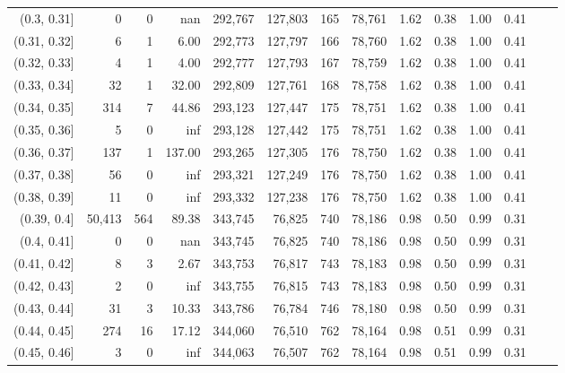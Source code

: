 \begin{tabular}{rrrrrrrrrrrrrr}
(0.3, 0.31]    &       0 &       0 &       nan &  292,767 &  127,803 &     165 &  78,761 &  1.62 &  0.38 &  1.00 &      0.41 \\
(0.31, 0.32]   &       6 &       1 &      6.00 &  292,773 &  127,797 &     166 &  78,760 &  1.62 &  0.38 &  1.00 &      0.41 \\
(0.32, 0.33]   &       4 &       1 &      4.00 &  292,777 &  127,793 &     167 &  78,759 &  1.62 &  0.38 &  1.00 &      0.41 \\
(0.33, 0.34]   &      32 &       1 &     32.00 &  292,809 &  127,761 &     168 &  78,758 &  1.62 &  0.38 &  1.00 &      0.41 \\
(0.34, 0.35]   &     314 &       7 &     44.86 &  293,123 &  127,447 &     175 &  78,751 &  1.62 &  0.38 &  1.00 &      0.41 \\
(0.35, 0.36]   &       5 &       0 &       inf &  293,128 &  127,442 &     175 &  78,751 &  1.62 &  0.38 &  1.00 &      0.41 \\
(0.36, 0.37]   &     137 &       1 &    137.00 &  293,265 &  127,305 &     176 &  78,750 &  1.62 &  0.38 &  1.00 &      0.41 \\
(0.37, 0.38]   &      56 &       0 &       inf &  293,321 &  127,249 &     176 &  78,750 &  1.62 &  0.38 &  1.00 &      0.41 \\
(0.38, 0.39]   &      11 &       0 &       inf &  293,332 &  127,238 &     176 &  78,750 &  1.62 &  0.38 &  1.00 &      0.41 \\
(0.39, 0.4]    &  50,413 &     564 &     89.38 &  343,745 &   76,825 &     740 &  78,186 &  0.98 &  0.50 &  0.99 &      0.31 \\
(0.4, 0.41]    &       0 &       0 &       nan &  343,745 &   76,825 &     740 &  78,186 &  0.98 &  0.50 &  0.99 &      0.31 \\
(0.41, 0.42]   &       8 &       3 &      2.67 &  343,753 &   76,817 &     743 &  78,183 &  0.98 &  0.50 &  0.99 &      0.31 \\
(0.42, 0.43]   &       2 &       0 &       inf &  343,755 &   76,815 &     743 &  78,183 &  0.98 &  0.50 &  0.99 &      0.31 \\
(0.43, 0.44]   &      31 &       3 &     10.33 &  343,786 &   76,784 &     746 &  78,180 &  0.98 &  0.50 &  0.99 &      0.31 \\
(0.44, 0.45]   &     274 &      16 &     17.12 &  344,060 &   76,510 &     762 &  78,164 &  0.98 &  0.51 &  0.99 &      0.31 \\
(0.45, 0.46]   &       3 &       0 &       inf &  344,063 &   76,507 &     762 &  78,164 &  0.98 &  0.51 &  0.99 &      0.31 \\

\end{tabular}
